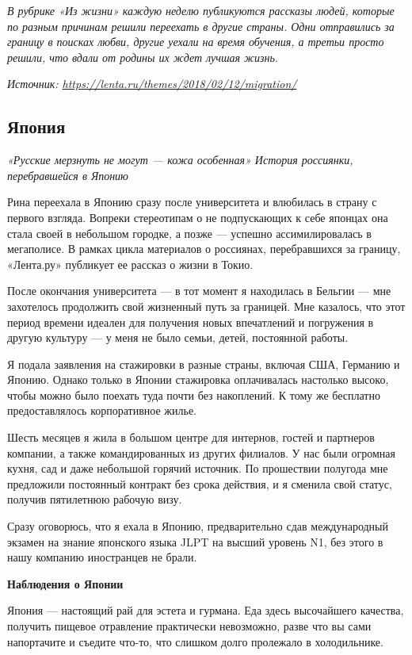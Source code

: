 {
    \it В рубрике «Из жизни» каждую неделю публикуются рассказы людей, которые по разным причинам решили переехать в другие страны. Одни отправились за границу в поисках любви, другие уехали на время обучения, а третьи просто решили, что вдали от родины их ждет лучшая жизнь.
}

\textit{Источник: \url{https://lenta.ru/themes/2018/02/12/migration/}}

\subsection{Япония}

\textit{«Русские мерзнуть не могут — кожа особенная» История россиянки, перебравшейся в Японию}

Рина переехала в Японию сразу после университета и влюбилась в страну с первого взгляда. Вопреки стереотипам о не подпускающих к себе японцах она стала своей в небольшом городке, а позже — успешно ассимилировалась в мегаполисе. В рамках цикла материалов о россиянах, перебравшихся за границу, «Лента.ру» публикует ее рассказ о жизни в Токио.

После окончания университета — в тот момент я находилась в Бельгии — мне захотелось продолжить свой жизненный путь за границей. Мне казалось, что этот период времени идеален для получения новых впечатлений и погружения в другую культуру — у меня не было семьи, детей, постоянной работы.

Я подала заявления на стажировки в разные страны, включая США, Германию и Японию. Однако только в Японии стажировка оплачивалась настолько высоко, чтобы можно было поехать туда почти без накоплений. К тому же бесплатно предоставлялось корпоративное жилье.

Шесть месяцев я жила в большом центре для интернов, гостей и партнеров компании, а также командированных из других филиалов. У нас были огромная кухня, сад и даже небольшой горячий источник. По прошествии полугода мне предложили постоянный контракт без срока действия, и я сменила свой статус, получив пятилетнюю рабочую визу.

Сразу оговорюсь, что я ехала в Японию, предварительно сдав международный экзамен на знание японского языка JLPT на высший уровень N1, без этого в нашу компанию иностранцев не брали.

\newpage
\textbf{Наблюдения о Японии}

Япония — настоящий рай для эстета и гурмана. Еда здесь высочайшего качества, получить пищевое отравление практически невозможно, разве что вы сами напортачите и съедите что-то, что слишком долго пролежало в холодильнике.

